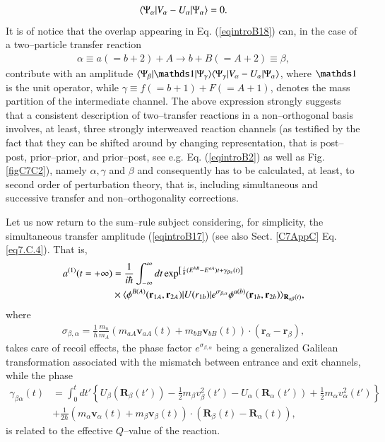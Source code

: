 \begin{align}
\langle {\Psi_\alpha|V_\alpha-U_\alpha|\Psi_\alpha} \rangle=0.
\end{align}
It is of notice that the overlap appearing in Eq. (\ref{eqintroB18}) can, in the case of a two--particle transfer reaction 
\begin{align}
\alpha\equiv a (=b+2)+A\rightarrow b+B(=A+2)\equiv\beta,
\end{align}
contribute with an amplitude $\braket{\Psi_\beta|\idop|\Psi_\gamma}\braket{\Psi_\gamma|V_\alpha-U_\alpha|\Psi_\alpha}$, where $\idop$ is the unit operator, while $\gamma\equiv f(=b+1)+F(=A+1)$, denotes the mass partition of the intermediate channel. The above expression strongly suggests that a consistent description of two--transfer reactions in a non--orthogonal basis involves, at least, three strongly interweaved  reaction channels (as testified by the fact that they can be shifted around by changing representation, that is post--post, prior--prior, and prior--post, see e.g. Eq. (\ref{eqintroB2}) as well as Fig. \ref{figC7C2}), namely $\alpha,\gamma$ and $\beta$ and consequently has to be calculated, at least, to second order of perturbation theory, that is, including simultaneous and successive transfer and non--orthogonality corrections.

Let us now return to the sum--rule subject considering,  for simplicity, the simultaneous transfer amplitude (\ref{eqintroB17}) (see also Sect. \ref{C7AppC} Eq. \ref{eq7.C.4}). That is,
\begin{align}\label{eqintroB19}
\nonumber a^{(1)}(t=+\infty)&=\frac{1}{i\hbar}\int^{\infty}_{-\infty}dt\exp^{\left[\frac{i}{\hbar}(E^{bB}-E^{aA})t+\gamma_{\beta\alpha}(t)\right]}\\
&\times\langle {\phi^{B(A)}(\mathbf r_{1A},\mathbf r_{2A})|U(r_{1b})|e^{\sigma_{\beta,\alpha}}\phi^{a(b)}(\mathbf r_{1b},\mathbf r_{2b})} \rangle_{\mathbf R_{\alpha\beta}(t)},
\end{align}
where
\begin{align}
\sigma_{\beta,\alpha}=\frac{1}{\hbar}\frac{m_n}{m_A}(m_{aA}\mathbf v_{aA}(t)+m_{bB}\mathbf v_{bB}(t))\cdot(\mathbf r_\alpha-\mathbf r_\beta),
\end{align}
takes care of recoil effects, the phase factor $e^{\sigma_{\beta,\alpha}}$ being a generalized Galilean transformation associated with the mismatch between entrance and exit channels,  while the phase
\begin{align}\label{eqintroB21}
\nonumber\gamma_{\beta\alpha}(t)&=\int^t_0 dt'\left\{U_\beta(\mathbf R_{\beta}(t'))-\frac{1}{2}m_\beta v_\beta^2(t')-U_\alpha(\mathbf R_\alpha(t'))+\frac{1}{2}m_\alpha v_\alpha^2(t')\right\}\\
&+\frac{1}{2\hbar}\left(m_\alpha \mathbf v_\alpha(t)+m_\beta \mathbf v_\beta(t) \right)\cdot(\mathbf R_\beta(t)-\mathbf R_\alpha(t)),
\end{align}
is related to the effective $Q$--value of the reaction.


